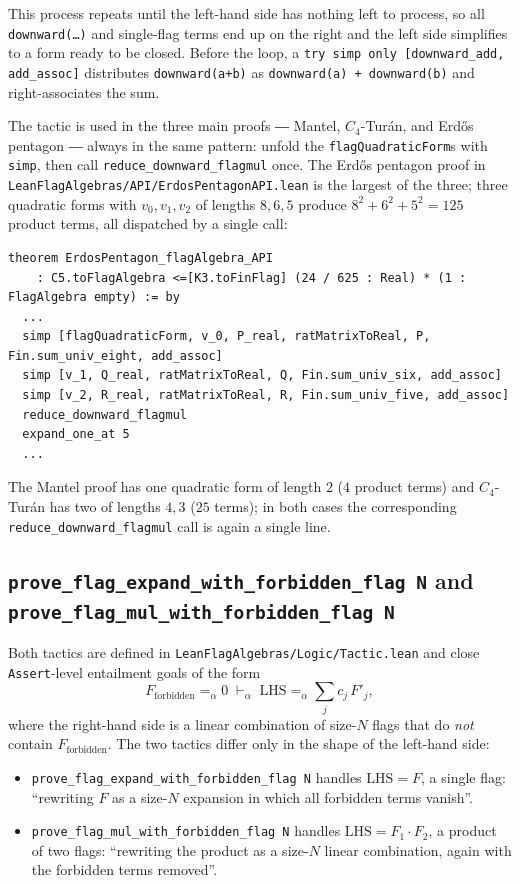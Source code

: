 \documentclass[11pt]{article}
\begin{document}
This process repeats until the left-hand side has nothing left to
process, so all \texttt{downward(\ldots)} and single-flag terms end
up on the right and the left side simplifies to a form ready to be
closed. Before the loop, a
\texttt{try simp only [downward\_add, add\_assoc]} distributes
\texttt{downward(a+b)} as \texttt{downward(a) + downward(b)} and
right-associates the sum.

The tactic is used in the three main proofs ― Mantel, $C_4$-Tur\'an,
and Erd\H{o}s pentagon ― always in the same pattern: unfold the
\texttt{flagQuadraticForm}s with \texttt{simp}, then call
\texttt{reduce\_downward\_flagmul} once. The Erd\H{o}s pentagon proof
in \texttt{LeanFlagAlgebras/API/ErdosPentagonAPI.lean} is the largest
of the three; three quadratic forms with $v_0, v_1, v_2$ of lengths
$8, 6, 5$ produce $8^2 + 6^2 + 5^2 = 125$ product terms, all
dispatched by a single call:

\begin{lstlisting}
theorem ErdosPentagon_flagAlgebra_API
    : C5.toFlagAlgebra <=[K3.toFinFlag] (24 / 625 : Real) * (1 : FlagAlgebra empty) := by
  ...
  simp [flagQuadraticForm, v_0, P_real, ratMatrixToReal, P, Fin.sum_univ_eight, add_assoc]
  simp [v_1, Q_real, ratMatrixToReal, Q, Fin.sum_univ_six, add_assoc]
  simp [v_2, R_real, ratMatrixToReal, R, Fin.sum_univ_five, add_assoc]
  reduce_downward_flagmul
  expand_one_at 5
  ...
\end{lstlisting}

The Mantel proof has one quadratic form of length $2$ ($4$ product
terms) and $C_4$-Tur\'an has two of lengths $4, 3$ ($25$ terms); in
both cases the corresponding \texttt{reduce\_downward\_flagmul} call
is again a single line.

\subsection{\texttt{prove\_flag\_expand\_with\_forbidden\_flag N} and
\texttt{prove\_flag\_mul\_with\_forbidden\_flag N}}

Both tactics are defined in \texttt{LeanFlagAlgebras/Logic/Tactic.lean}
and close \texttt{Assert}-level entailment goals of the form
\[
   F_{\text{forbidden}} =_\alpha 0 \;\vdash_\alpha\;
   \mathrm{LHS} =_\alpha \sum_j c_j\,F'_j,
\]
where the right-hand side is a linear combination of size-$N$ flags
that do \emph{not} contain $F_{\text{forbidden}}$. The two tactics
differ only in the shape of the left-hand side:

\begin{itemize}
  \item \texttt{prove\_flag\_expand\_with\_forbidden\_flag N} handles
    $\mathrm{LHS} = F$, a single flag: ``rewriting $F$ as a size-$N$
    expansion in which all forbidden terms vanish''.
  \item \texttt{prove\_flag\_mul\_with\_forbidden\_flag N} handles
    $\mathrm{LHS} = F_1 \cdot F_2$, a product of two flags: ``rewriting
    the product as a size-$N$ linear combination, again with the
    forbidden terms removed''.
\end{itemize}
\end{document}
